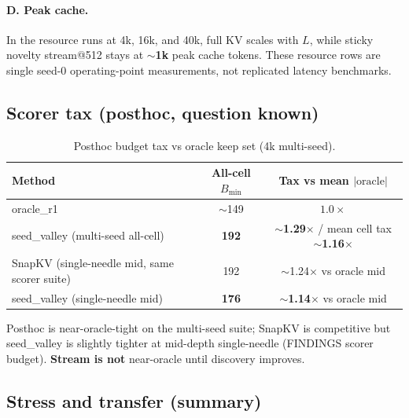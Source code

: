 \documentclass[11pt,a4paper]{article}
\begin{document}
\paragraph{D. Peak cache.}
In the resource runs at 4k, 16k, and 40k, full KV scales with $L$, while sticky novelty stream@512 stays at $\sim$\textbf{1k} peak cache tokens. These resource rows are single seed-0 operating-point measurements, not replicated latency benchmarks.

\subsection{Scorer tax (posthoc, question known)}

\begin{table}[!htbp]
\centering
\caption{Posthoc budget tax vs oracle keep set (4k multi-seed).}
\label{tab:tax}
\begin{tabular}{@{}lcc@{}}
\toprule
Method & All-cell $B_{\min}$ & Tax vs mean $|\mathrm{oracle}|$ \\
\midrule
oracle\_r1 & $\sim$149 & $1.0\times$ \\
seed\_valley (multi-seed all-cell) & \textbf{192} & $\sim$\textbf{1.29}$\times$ / mean cell tax $\sim$\textbf{1.16}$\times$ \\
SnapKV (single-needle mid, same scorer suite) & 192 & $\sim$1.24$\times$ vs oracle mid \\
seed\_valley (single-needle mid) & \textbf{176} & $\sim$\textbf{1.14}$\times$ vs oracle mid \\
\bottomrule
\end{tabular}
\end{table}

Posthoc is near-oracle-tight on the multi-seed suite; SnapKV is competitive but seed\_valley is slightly tighter at mid-depth single-needle (FINDINGS scorer budget). \textbf{Stream is not} near-oracle until discovery improves.

\subsection{Stress and transfer (summary)}
\end{document}
